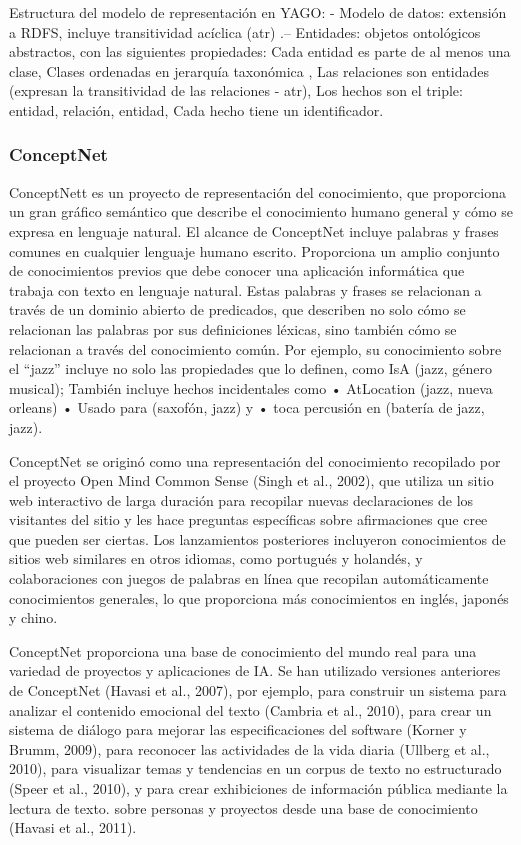 Estructura del modelo de representación en YAGO: - Modelo de datos: extensión a RDFS, incluye transitividad acíclica (atr) .– Entidades: objetos ontológicos abstractos, con las siguientes propiedades: Cada entidad es parte de al menos una clase, Clases ordenadas en jerarquía taxonómica , Las relaciones son entidades (expresan la transitividad de las relaciones - atr), Los hechos son el triple: entidad, relación, entidad, Cada hecho tiene un identificador.

\subsubsection*{ConceptNet}

ConceptNett es un proyecto de representación del conocimiento, que proporciona un gran gráfico semántico que describe el conocimiento humano general y cómo se expresa en lenguaje natural. El alcance de ConceptNet incluye palabras y frases comunes en cualquier lenguaje humano escrito. Proporciona un amplio conjunto de conocimientos previos que debe conocer una aplicación informática que trabaja con texto en lenguaje natural. Estas palabras y frases se relacionan a través de un dominio abierto de predicados, que describen no solo cómo se relacionan las palabras por sus definiciones léxicas, sino también cómo se relacionan a través del conocimiento común. Por ejemplo, su conocimiento sobre el “jazz” incluye no solo las propiedades que lo definen, como IsA (jazz, género musical); También incluye hechos incidentales como
• AtLocation (jazz, nueva orleans)
• Usado para (saxofón, jazz) y
• toca percusión en (batería de jazz, jazz).

ConceptNet se originó como una representación del conocimiento recopilado por el proyecto Open Mind Common Sense (Singh et al., 2002), que utiliza un sitio web interactivo de larga duración para recopilar nuevas declaraciones de los visitantes del sitio y les hace preguntas específicas sobre afirmaciones que cree que pueden ser ciertas. Los lanzamientos posteriores incluyeron conocimientos de sitios web similares en otros idiomas, como portugués y holandés, y colaboraciones con juegos de palabras en línea que recopilan automáticamente conocimientos generales, lo que proporciona más conocimientos en inglés, japonés y chino.

ConceptNet proporciona una base de conocimiento del mundo real para una variedad de proyectos y aplicaciones de IA. Se han utilizado versiones anteriores de ConceptNet (Havasi et al., 2007), por ejemplo, para construir un sistema para analizar el contenido emocional del texto (Cambria et al., 2010), para crear un sistema de diálogo para mejorar las especificaciones del software (Korner y Brumm, 2009), para reconocer las actividades de la vida diaria (Ullberg et al., 2010), para visualizar temas y tendencias en un corpus de texto no estructurado (Speer et al., 2010), y para crear exhibiciones de información pública mediante la lectura de texto. sobre personas y proyectos desde una base de conocimiento (Havasi et al., 2011).

